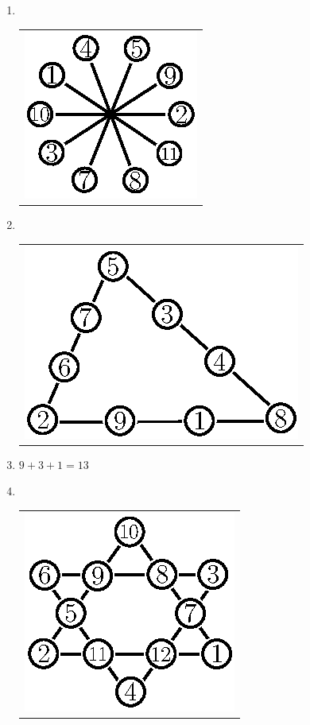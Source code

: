 \begin{enumerate}
\medskip

\item 
~

  \vskip -0.5cm
  
\begin{tabular}[t]{c}
\centering
\includegraphics{src/figures/ans20.eps}
\end{tabular}

\medskip

\item 
~

  \vskip -0.5cm
  
\begin{tabular}[t]{c}
\centering
\includegraphics{src/figures/ans21.eps}
\end{tabular}

\medskip

\item $9+3+1=13$

  \medskip
  
\item 
~

  \vskip -0.5cm
  
\begin{tabular}[t]{c}
\centering
\includegraphics{src/figures/ans23.eps}
\end{tabular}


\end{enumerate}
